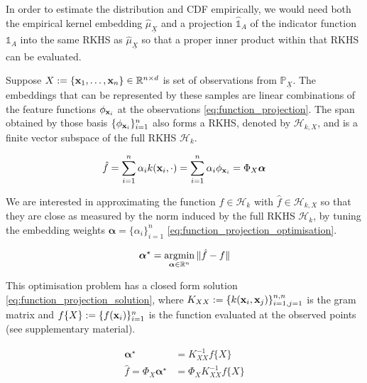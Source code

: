 \documentclass[twoside]{article} \usepackage{aistats2017}
\theoremstyle{definition}
\theoremstyle{remark}
\newcommand{\argmin}{\operatornamewithlimits{argmin}}
\newcommand{\rv}[1]{\underline{#1}}
\newcommand{\ds}[1]{{#1}}
\begin{document}
		In order to estimate the distribution and CDF empirically, we would need both the empirical kernel embedding $\hat{\mu}_{\rv{X}}$ and a projection $\hat{\mathbb{1}}_{A}$ of the indicator function $\mathbb{1}_{A}$ into the same RKHS as $\hat{\mu}_{\rv{X}}$ so that a proper inner product within that RKHS can be evaluated.

		Suppose $\ds{X} := \{\bvec{x}_{1}, \dots, \bvec{x}_{n}\} \in \mathbb{R}^{n \times d}$ is set of observations from $\mathbb{P}_{\rv{X}}$. The embeddings that can be represented by these samples are linear combinations of the feature functions $\phi_{\mathbf{x}_{i}}$ at the observations \eqref{eq:function_projection}. The span obtained by those basis $\{\phi_{\mathbf{x}_{i}}\}_{i = 1}^{n}$ also forms a RKHS, denoted by $\mathcal{H}_{k, \ds{X}}$, and is a finite vector subspace of the full RKHS $\mathcal{H}_{k}$.
		
		\begin{equation}
			\hat{f} = \sum_{i = 1}^{n} \alpha_{i} k(\bvec{x}_{i}, \cdot) = \sum_{i = 1}^{n} \alpha_{i} \phi_{\bvec{x}_{i}} = \Phi_{\ds{X}} \bm{\alpha}
		\label{eq:function_projection}
		\end{equation}
	
		We are interested in approximating the function $f \in \mathcal{H}_{k}$ with $\hat{f} \in \mathcal{H}_{k, \ds{X}}$ so that they are close as measured by the norm induced by the full RKHS $\mathcal{H}_{k}$, by tuning the embedding weights $\bm{\alpha} = \{\alpha_{i}\}_{i = 1}^{n}$ \eqref{eq:function_projection_optimisation}.
			
		\begin{equation}
			\bm{\alpha}^{\star} = \argmin_{\bm{\alpha} \in \mathbb{R}^{n}} \Vert \hat{f} - f \Vert
		\label{eq:function_projection_optimisation}
		\end{equation}
		
		This optimisation problem has a closed form solution \eqref{eq:function_projection_solution}, where $K_{\ds{X} \ds{X}} := \{k(\bvec{x}_{i}, \bvec{x}_{j})\}_{i = 1, j = 1}^{n, n}$ is the gram matrix and $f\{\ds{X}\} := \{f(\bvec{x}_{i})\}_{i = 1}^{n}$ is the function evaluated at the observed points (see supplementary material).
		
		\begin{equation}
			\begin{aligned}
				\bm{\alpha}^{\star} &= K_{\ds{X} \ds{X}}^{-1} f\{\ds{X}\} \\
				\hat{f} = \Phi_{\ds{X}} \bm{\alpha}^{\star} &= \Phi_{\ds{X}} K_{\ds{X} \ds{X}}^{-1} f\{\ds{X}\}
			\end{aligned}
		\label{eq:function_projection_solution}
		\end{equation}
		
\end{document}
